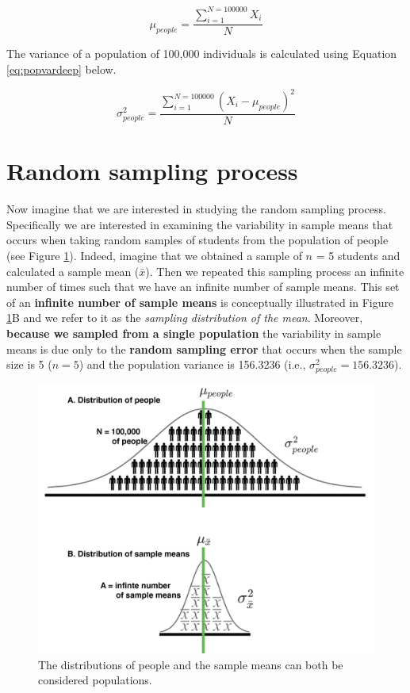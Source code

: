 \documentclass[
]{krantz}
\begin{document}
\begin{equation} 
\mu_{people} = \frac{\sum_{i=1}^{N=100000}{X_i}}{N}
      \label{eq:popmeanchdeep}
\end{equation}

The variance of a population of 100,000 individuals is calculated using Equation \eqref{eq:popvardeep} below.

\begin{equation} 
\sigma_{people}^2 = \frac{\sum_{i=1}^{N=100000}{(X_i - \mu_{people})^2}}{N}
      \label{eq:popvardeep}
\end{equation}

\hypertarget{random-sampling-process}{%
\section{Random sampling process}\label{random-sampling-process}}

Now imagine that we are interested in studying the random sampling process. Specifically we are interested in examining the variability in sample means that occurs when taking random samples of students from the population of people (see Figure \ref{fig:chdeepfigure1}). Indeed, imagine that we obtained a sample of \(n\) = 5 students and calculated a sample mean (\(\bar{x}\)). Then we repeated this sampling process an infinite number of times such that we have an infinite number of sample means. This set of an \textbf{infinite number of sample means} is conceptually illustrated in Figure \ref{fig:chdeepfigure1}B and we refer to it as the \emph{sampling distribution of the mean}. Moreover, \textbf{because we sampled from a single population} the variability in sample means is due only to the \textbf{random sampling error} that occurs when the sample size is 5 (\(n = 5\)) and the population variance is 156.3236 (i.e., \(\sigma_{people}^2 =156.3236\)).

\hfill\break

\begin{figure}
\includegraphics[width=0.6\linewidth]{ch_deep_sampling/images/figure1} \caption{The distributions of people and the sample means can both be considered populations.}\label{fig:chdeepfigure1}
\end{figure}
\end{document}

